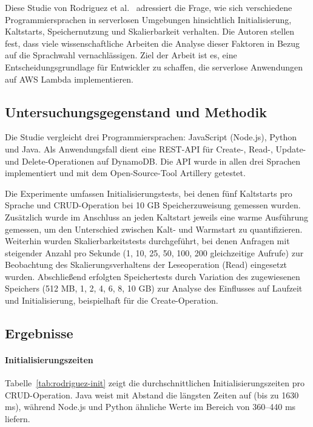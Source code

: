 Diese Studie von Rodriguez et al.~\cite{Rodriguez2024Evaluation} adressiert die Frage, wie
 sich verschiedene Programmiersprachen in serverlosen Umgebungen 
 hinsichtlich Initialisierung, Kaltstarts, Speichernutzung und Skalierbarkeit verhalten. 
 Die Autoren stellen fest, dass viele wissenschaftliche Arbeiten die Analyse dieser Faktoren in Bezug auf die Sprachwahl vernachlässigen. 
 Ziel der Arbeit ist es, eine Entscheidungsgrundlage für Entwickler zu schaffen, 
 die serverlose Anwendungen auf AWS Lambda implementieren.

\subsection{Untersuchungsgegenstand und Methodik}
\label{subsec:rodriguez-methodology}

Die Studie vergleicht drei Programmiersprachen: JavaScript (Node.js), Python und Java. 
Als Anwendungsfall dient eine REST-API für Create-, Read-, Update- und Delete-Operationen auf DynamoDB. 
Die API wurde in allen drei Sprachen implementiert und mit dem Open-Source-Tool Artillery getestet. 

Die Experimente umfassen Initialisierungstests, bei denen fünf Kaltstarts pro Sprache und CRUD-Operation bei 10 GB 
Speicherzuweisung gemessen wurden. Zusätzlich wurde im Anschluss an jeden Kaltstart jeweils eine warme Ausführung gemessen, 
um den Unterschied zwischen Kalt- und Warmstart zu quantifizieren. Weiterhin wurden Skalierbarkeitstests durchgeführt, 
bei denen Anfragen mit steigender Anzahl pro Sekunde (1, 10, 25, 50, 100, 200 gleichzeitige Aufrufe) 
zur Beobachtung des Skalierungsverhaltens der Leseoperation (Read) eingesetzt wurden. 
Abschließend erfolgten Speichertests durch Variation des zugewiesenen Speichers (512 MB, 1, 2, 4, 6, 8, 10 GB) 
zur Analyse des Einflusses auf Laufzeit und Initialisierung, beispielhaft für die Create-Operation.

\subsection{Ergebnisse}
\label{subsec:rodriguez-results}

\paragraph{Initialisierungszeiten}
Tabelle~\ref{tab:rodriguez-init} zeigt die durchschnittlichen Initialisierungszeiten pro CRUD-Operation. Java weist mit Abstand 
die längsten Zeiten auf (bis zu 1630 ms), während Node.js und Python ähnliche Werte im Bereich von 360–440 ms liefern.

